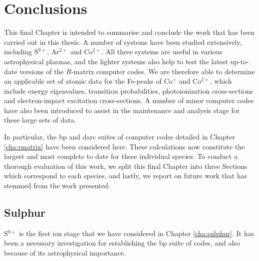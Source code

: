 
\chapter{Conclusions} %

\label{cha:conclusions} %



This final Chapter is intended to summarise and conclude the work that has been carried out in this thesis. A number of systems have been studied extensively, including S$^{9+}$, Ar$^{2+}$ and Co$^{2+}$. All three systems are useful in various astrophysical plasmas, and the lighter systems also help to test the latest up-to-date versions of the $R$-matrix computer codes. We are therefore able to determine an applicable set of atomic data for the Fe-peaks of Co$^{+}$ and Co$^{2+}$, which include energy eigenvalues, transition probabilities, photoionization cross-sections and electron-impact excitation cross-sections. A number of minor computer codes have also been introduced to assist in the maintenance and analysis stage for these large sets of data.

In particular, the {\sc bp} and {\sc darc} suites of computer codes detailed in Chapter \ref{cha:rmatrix} have been considered here. These calculations now constitute the largest and most complete to date for these individual species. To conduct a thorough evaluation of this work, we split this final Chapter into three Sections which correspond to each species, and lastly, we report on future work that has stemmed from the work presented.

\newpage

\section{Sulphur}
S$^{9+}$ is the first ion stage that we have considered in Chapter \ref{cha:sulphur}. It has been a necessary investigation for establishing the {\sc bp} suite of codes, and also because of its astrophysical importance.

